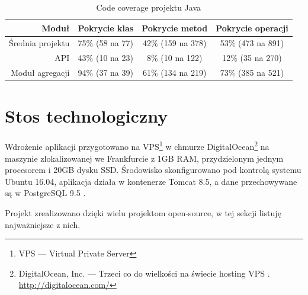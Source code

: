 \documentclass[openright]{xmgr}
\begin{document}
\begin{table}

	\begin{tabular}{|r|c|c|c|}
		\hline
		Moduł & Pokrycie klas & Pokrycie metod & Pokrycie operacji \\ \hline
		Średnia projektu & 75\% (58 na 77) & 42\% (159 na 378) & 53\% (473 na 891) \\
        \hline
		API & 43\% (10 na 23) & 8\% (10 na 122) & 12\% (35 na 270) \\
		Moduł agregacji & 94\% (37 na 39) & 61\% (134 na 219) & 73\% (385 na 521) \\
        \hline
	\end{tabular}

    \caption{
	Code coverage projektu Java
	}
\label{Projekt --- Code coverage}
\end{table}

\section{Stos technologiczny}

    Wdrożenie aplikacji przygotowano na VPS\footnote{VPS --- Virtual Private Server} w chmurze
    DigitalOcean\footnote{DigitalOcean, Inc. --- Trzeci co do wielkości na świecie hosting VPS \cite{digitalocean:growth}. \url{http://digitalocean.com/}}
    na maszynie zlokalizowanej we Frankfurcie z 1GB RAM, przydzielonym jednym procesorem i 20GB dysku SSD.
    Środowisko skonfigurowano pod kontrolą systemu Ubuntu 16.04,
    aplikacja działa w kontenerze Tomcat 8.5, a dane przechowywane są w PostgreSQL 9.5
    \cite{digitalocean:server-setup}\cite{digitalocean:tomcat-setup}\cite{digitalocean:postgres-setup}.

    Projekt zrealizowano dzięki wielu projektom open-source, w tej sekcji listuję najważniejsze z nich.
\end{document}
